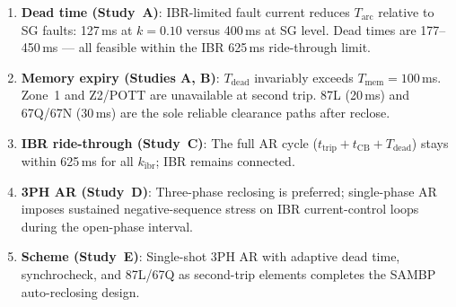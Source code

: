 \documentclass[11pt,a4paper]{article}
\begin{document}
\begin{enumerate}
  \item \textbf{Dead time (Study~A)}: IBR-limited fault current reduces
    $T_\mathrm{arc}$ relative to SG faults: 127\,ms at $k=0.10$ versus
    400\,ms at SG level.  Dead times are 177--450\,ms --- all feasible within
    the IBR 625\,ms ride-through limit.

  \item \textbf{Memory expiry (Studies A, B)}: $T_\mathrm{dead}$ invariably
    exceeds $T_\mathrm{mem}=100$\,ms.  Zone~1 and Z2/POTT are unavailable at
    second trip.  87L (20\,ms) and 67Q/67N (30\,ms) are the sole reliable
    clearance paths after reclose.

  \item \textbf{IBR ride-through (Study~C)}: The full AR cycle
    ($t_\mathrm{trip}+t_\mathrm{CB}+T_\mathrm{dead}$) stays within 625\,ms
    for all $k_\mathrm{ibr}$; IBR remains connected.

  \item \textbf{3PH AR (Study~D)}: Three-phase reclosing is preferred;
    single-phase AR imposes sustained negative-sequence stress on IBR
    current-control loops during the open-phase interval.

  \item \textbf{Scheme (Study~E)}: Single-shot 3PH AR with adaptive dead time,
    synchrocheck, and 87L/67Q as second-trip elements completes the
    SAMBP auto-reclosing design.
\end{enumerate}



\end{document}
